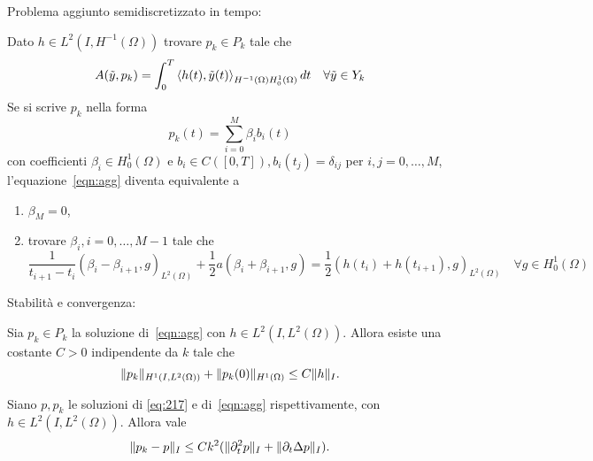 Problema aggiunto semidiscretizzato in tempo:

Dato $h\in L^2(I,H^{-1}(\Omega))$ trovare $p_k\in P_k$ tale che 
\begin{equation}
\label{eqn:agg}
A(\tilde{y},p_k)=\int^T_0 \Braket{h(t),\tilde{y}(t)}_{H^{-1}(\Omega)H^1_0(\Omega)}dt\quad\forall\tilde{y}\in Y_k
\end{equation}
Se si scrive $p_k$ nella forma 
\[
p_k(t)=\sum^M_{i=0}\beta_i b_i(t)
\]
con coefficienti $\beta_i\in H^1_0(\Omega)$ e $b_i\in C([0,T]), b_i(t_j)=\delta_{ij}$ per $i,j=0,\dots,M$, l'equazione~\eqref{eqn:agg} diventa equivalente a
\begin{enumerate}
\item $\beta_M=0$,
\item trovare $\beta_i,i=0,\dots,M-1$ tale che
\begin{equation}
\label{eqn:agg1}
\frac{1}{t_{i+1}-t_i}(\beta_i-\beta_{i+1},g)_{L^2(\Omega)} + \frac{1}{2}a(\beta_i+\beta_{i+1},g)=\frac{1}{2}(h(t_i)+h(t_{i+1}),g)_{L^2(\Omega)}\quad\forall g\in H^1_0(\Omega)
\end{equation}
\end{enumerate}
Stabilità e convergenza:
\begin{lemma}
\label{stab:agg}
Sia $p_k\in P_k$ la soluzione di~\eqref{eqn:agg} con $h\in L^2(I,L^2(\Omega))$. Allora esiste una costante $C>0$ indipendente da $k$ tale che
\[
\lVert p_k\rVert_{H^1(I,L^2(\Omega))} + \lVert p_k(0)\rVert_{H^1(\Omega)} \le C\lVert h\rVert_I.
\]
\end{lemma}
\begin{lemma}
\label{conv:agg}
Siano $p,p_k$ le soluzioni di \ref{eq:217} e di~\eqref{eqn:agg} rispettivamente, con $h\in L^2(I,L^2(\Omega))$. Allora vale
\[
\lVert p_k-p\rVert_I\le Ck^2(\lVert\partial^2_t p\rVert_I + \lVert\partial_t\Delta p\rVert_I).
\]
\end{lemma}
